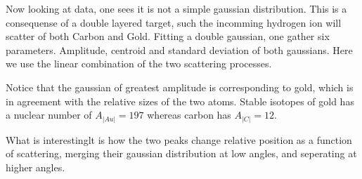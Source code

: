 Now looking at data, one sees it is not a simple gaussian distribution. This is
a consequense of a double layered target, such the incomming hydrogen ion will
scatter of both Carbon and Gold. Fitting a double gaussian, one gather
six parameters. Amplitude, centroid and standard deviation of both gaussians.
Here we use the linear combination of the two scattering processes. 

Notice that the gaussian of greatest amplitude is corresponding to gold, which
is in agreement with the relative sizes of the two atoms. Stable isotopes of
gold has a nuclear number of $A_|Au| = 197$ whereas carbon has $A_|C| = 12$.

What is interestinglt is how the two peaks change relative position as a
function of scattering, merging their gaussian distribution at low angles, and
seperating at higher angles. 

